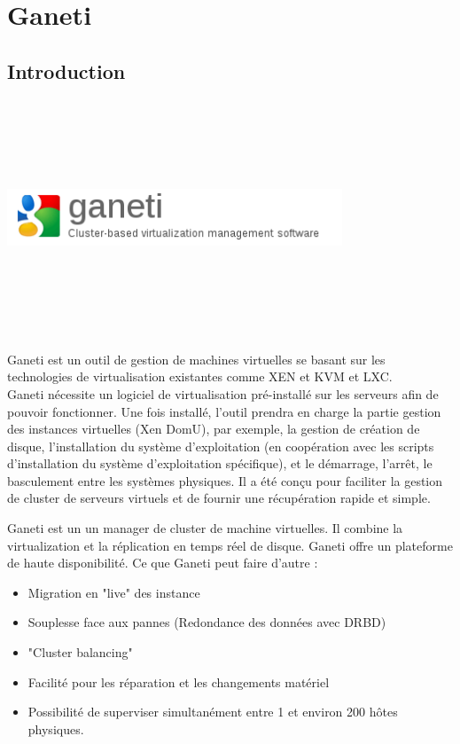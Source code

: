 \chapter{Ganeti}
\section{Introduction}

\includegraphics[width=10cm,height=7cm]{images/logo_ganeti.png}

Ganeti est un outil de gestion de machines virtuelles se basant sur les technologies de virtualisation existantes comme XEN et KVM et LXC.\\
Ganeti nécessite un logiciel de virtualisation pré-installé sur les serveurs afin de pouvoir fonctionner. Une fois installé, 
l'outil prendra en charge la partie gestion des instances virtuelles (Xen DomU), par exemple, la gestion de création de disque, 
l'installation du système d'exploitation (en coopération avec les scripts d'installation du système d'exploitation 
spécifique), et le démarrage, l'arrêt, le basculement entre les systèmes physiques. Il a été conçu pour faciliter la gestion de 
cluster de serveurs virtuels et de fournir une récupération rapide et simple.

Ganeti est un un manager de cluster de machine virtuelles. Il combine la virtualization et la réplication en temps réel de disque.
Ganeti offre un plateforme de haute disponibilité.
Ce que Ganeti peut faire d'autre :
\begin{itemize}
\item Migration en "live" des instance
\item Souplesse face aux pannes (Redondance des données avec DRBD)
\item "Cluster balancing"
\item Facilité pour les réparation et les changements matériel
\item Possibilité de superviser simultanément entre 1 et environ 200 hôtes physiques.
\end{itemize}

